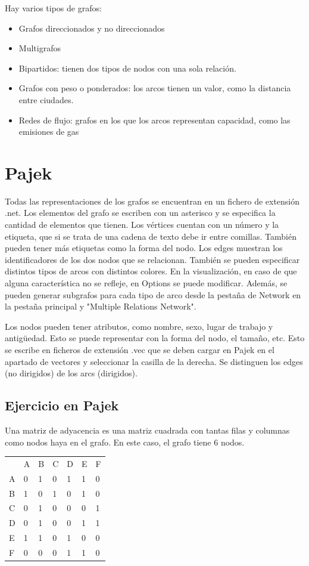\begin{itemize}
Hay varios tipos de grafos:
\begin{itemize}
\item Grafos direccionados y no direccionados
\item Multigrafos
\item Bipartidos: tienen dos tipos de nodos con una sola relación.
\item Grafos con peso o ponderados: los arcos tienen un valor, como la distancia entre ciudades.
\item Redes de flujo: grafos en los que los arcos representan capacidad, como las emisiones de gas
\end{itemize}
\end{itemize}

\section{Pajek} %
Todas las representaciones de los grafos se encuentran en un fichero de extensión .net. Los elementos del grafo se escriben con un asterisco y se especifica la cantidad de elementos que tienen. Los vértices cuentan con un número y la etiqueta, que si se trata de una cadena de texto debe ir entre comillas. También pueden tener más etiquetas como la forma del nodo. Los edges muestran los identificadores de los dos nodos que se relacionan. También se pueden especificar distintos tipos de arcos con distintos colores. En la visualización, en caso de que alguna característica no se refleje, en Options se puede modificar. Además, se pueden generar subgrafos para cada tipo de arco desde la pestaña de Network en la pestaña principal y "Multiple Relations Network". 

Los nodos pueden tener atributos, como nombre, sexo, lugar de trabajo y antigüedad. Esto se puede representar con la forma del nodo, el tamaño, etc. Esto se escribe en ficheros de extensión .vec que se deben cargar en Pajek en el apartado de vectores y seleccionar la casilla de la derecha. Se distinguen los edges (no dirigidos) de los arcs (dirigidos).  

\subsection{Ejercicio en Pajek}
Una matriz de adyacencia es una matriz cuadrada con tantas filas y columnas como nodos haya en el grafo. En este caso, el grafo tiene 6 nodos.

\begin{table}[htbp]
\begin{tabular}{lllllll}
& A & B & C & D & E & F\\
A & 0 & 1 & 0 & 1 & 1 & 0 \\
B & 1 & 0 & 1 & 0 & 1 & 0 \\
C & 0 & 1 & 0 & 0 & 0 & 1 \\
D & 0 & 1 & 0 & 0 & 1 & 1 \\
E & 1 & 1 & 0 & 1 & 0 & 0 \\
F & 0 & 0 & 0 & 1 & 1 & 0
\end{tabular}
\end{table}

